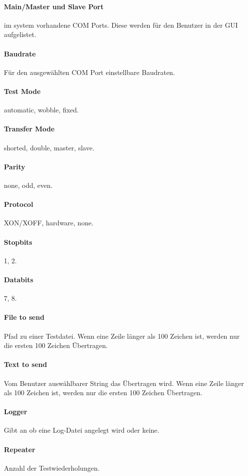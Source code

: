 \paragraph{Main/Master und Slave Port} im system vorhandene COM Ports. Diese werden für den Benutzer in der GUI aufgelistet.
\paragraph{Baudrate} Für den ausgewählten COM Port einstellbare Baudraten.
\paragraph{Test Mode} automatic, wobble, fixed.
\paragraph{Transfer Mode} shorted, double, master, slave.
\paragraph{Parity} none, odd, even.
\paragraph{Protocol} XON/XOFF, hardware, none.
\paragraph{Stopbits} 1, 2.
\paragraph{Databits} 7, 8.
\paragraph{File to send} Pfad zu einer Testdatei. Wenn eine Zeile länger als 100 Zeichen ist, werden nur die ersten 100 Zeichen Übertragen.
\paragraph{Text to send} Vom Benutzer auswählbarer String das Übertragen wird. Wenn eine Zeile länger als 100 Zeichen ist, werden nur die ersten 100 Zeichen Übertragen.
\paragraph{Logger} Gibt an ob eine Log-Datei angelegt wird oder keine.
\paragraph{Repeater} Anzahl der Testwiederholungen.


